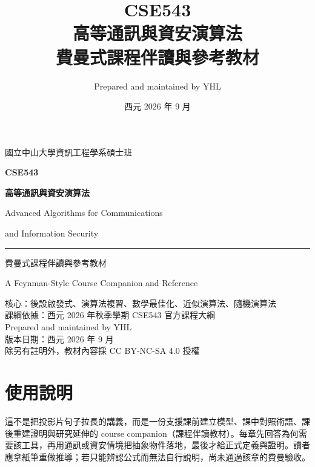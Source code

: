 \documentclass[11pt,a4paper,oneside,openany]{book}
\title{\sffamily\bfseries CSE543\\[.35em]
  高等通訊與資安演算法\\[.6em]
  \Large 費曼式課程伴讀與參考教材}
\author{Prepared and maintained by YHL}
\date{西元 2026 年 9 月}
\begin{document}
\hypersetup{pageanchor=false}
\begin{titlepage}
  \centering
  \vspace*{24mm}
  {\sffamily\Large 國立中山大學資訊工程學系碩士班\par}
  \vspace{24mm}
  {\sffamily\bfseries\fontsize{30}{38}\selectfont CSE543\par}
  \vspace{7mm}
  {\sffamily\bfseries\fontsize{25}{34}\selectfont
    高等通訊與資安演算法\par}
  \vspace{8mm}
  {\Large Advanced Algorithms for Communications\par
    and Information Security\par}
  \vspace{16mm}
  {\color{CSEblue}\rule{.62\textwidth}{.7pt}\par}
  \vspace{8mm}
  {\sffamily\Large 費曼式課程伴讀與參考教材\par}
  \vspace{3mm}
  {\large A Feynman-Style Course Companion and Reference\par}
  \vfill
  \begin{minipage}{.72\textwidth}
  \small\centering
  核心：後設啟發式、演算法複習、數學最佳化、近似演算法、隨機演算法\\[.5em]
  課綱依據：西元 2026 年秋季學期 CSE543 官方課程大綱\\[1.1em]
  {\sffamily Prepared and maintained by YHL}\\[.8em]
  {\sffamily 版本日期：西元 2026 年 9 月}\\[.8em]
  {\footnotesize 除另有註明外，教材內容採 CC BY-NC-SA 4.0 授權}
  \end{minipage}
  \vspace{15mm}
\end{titlepage}
\frontmatter
\hypersetup{pageanchor=true}

\chapter*{使用說明}
這不是把投影片句子拉長的講義，而是一份支援課前建立模型、課中對照術語、課後重建證明與研究延伸的 course companion（課程伴讀教材）。每章先回答為何需要該工具，再用通訊或資安情境把抽象物件落地，最後才給正式定義與證明。讀者應拿紙筆重做推導；若只能辨認公式而無法自行說明，尚未通過該章的費曼驗收。
\end{document}
